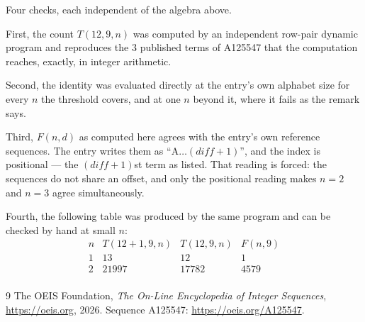 \documentclass[11pt,a4paper]{article}
\theoremstyle{plain}
\theoremstyle{definition}
\begin{document}
Four checks, each independent of the algebra above.

First, the count $T(12,9,n)$ was computed by an independent row-pair dynamic program and
reproduces the $3$ published terms of A125547 that the computation reaches,
exactly, in integer arithmetic.

Second, the identity was evaluated directly at the entry's own alphabet size for every $n$ the
threshold covers, and at one $n$ beyond it, where it fails as the remark says.

Third, $F(n,d)$ as computed here agrees with the entry's own reference sequences. The entry
writes them as ``$\mathrm{A}\dots(\mathit{diff}+1)$'', and the index is positional --- the
$(\mathit{diff}+1)$st term as listed. That reading is forced: the sequences do not share an
offset, and only the positional reading makes $n=2$ and $n=3$ agree simultaneously.

Fourth, the following table was produced by the same program and can be checked by hand at
small $n$:
\[
\begin{array}{rrrr}
n & T(12+1,9,n) & T(12,9,n) & F(n,9) \\ \hline
1 & 13 & 12 & 1 \\
2 & 21997 & 17782 & 4579 \\
\end{array}
\]

\begin{thebibliography}{9}
 The OEIS Foundation, \emph{The On-Line Encyclopedia of Integer Sequences},
\url{https://oeis.org}, 2026. Sequence A125547: \url{https://oeis.org/A125547}.
\end{thebibliography}
\end{document}
